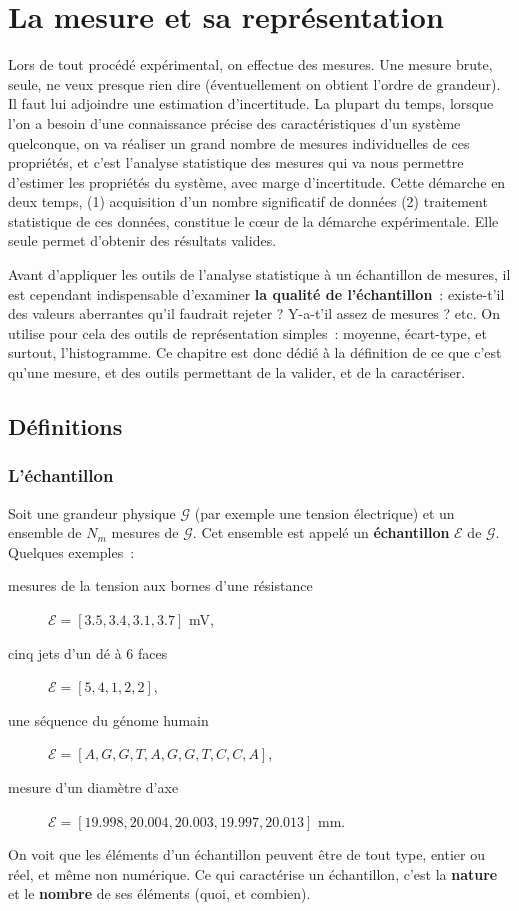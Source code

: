 \chapter{La mesure et sa représentation}

Lors de tout procédé expérimental, on effectue des mesures. Une mesure brute, seule, ne veux presque rien dire (éventuellement on obtient l'ordre de grandeur). Il faut lui adjoindre une estimation d'incertitude. La plupart du temps, lorsque l'on a besoin d'une connaissance précise des caractéristiques d'un système quelconque, on va réaliser un grand nombre de mesures individuelles de ces propriétés, et c'est l'analyse statistique des mesures qui va nous permettre d'estimer les propriétés du système, avec marge d'incertitude. Cette démarche en deux temps, (1) acquisition d'un nombre significatif de données (2) traitement statistique de ces données, constitue le c\oe ur de la démarche expérimentale. Elle seule permet d'obtenir des résultats valides.

Avant d'appliquer les outils de l'analyse statistique à un échantillon de mesures, il est cependant indispensable d'examiner \textbf{la qualité de l'échantillon}~: existe-t'il des valeurs aberrantes qu'il faudrait rejeter ? Y-a-t'il assez de mesures ? etc. On utilise pour cela des outils de représentation simples~: moyenne, écart-type, et surtout, l'histogramme. Ce chapitre est donc dédié à la définition de ce que c'est qu'une mesure, et des outils permettant de la valider, et de la caractériser.

\section{Définitions}

\subsection{L'échantillon}

Soit une grandeur physique $\mathcal{G}$ (par exemple une tension électrique) et un ensemble de $N_m$ mesures de $\mathcal{G}$. Cet ensemble est appelé un \textbf{échantillon} $\mathcal{E}$ de $\mathcal{G}$. Quelques exemples~:
\begin{description}
\item[mesures de la tension aux bornes d'une résistance] $\mathcal{E}=[3.5,3.4,3.1,3.7]$ mV,
\item[cinq jets d'un dé à 6 faces] $\mathcal{E}=[5,4,1,2,2]$,
\item[une séquence du génome humain] $\mathcal{E}=[A,G,G,T,A,G,G,T,C,C,A]$,
\item[mesure d'un diamètre d'axe] $\mathcal{E}=[19.998,20.004,20.003,19.997,20.013]$ mm.
\end{description}
On voit que les éléments d'un échantillon peuvent être de tout type, entier ou réel, et même non numérique. Ce qui caractérise un échantillon, c'est la \textbf{nature} et le \textbf{nombre} de ses éléments (quoi, et combien).

